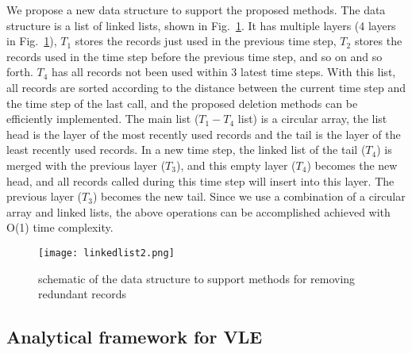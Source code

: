 We propose a new data structure to support the proposed methods. The data structure is a list of linked lists, shown in Fig.~\ref{ISAT_LL}. It has multiple layers (4 layers in Fig.~\ref{ISAT_LL}), $T_1$ stores the records just used in the previous time step, $T_2$ stores the records used in the time step before the previous time step, and so on and so forth. $T_4$ has all records not been used within 3 latest time steps. With this list, all records are sorted according to the distance between the current time step and the time step of the last call, and the proposed deletion methods can be efficiently implemented. The main list ($T_1-T_4$ list) is a circular array, the list head is the layer of the most recently used records and the tail is the layer of the least recently used records. In a new time step, the linked list of the tail ($T_4$) is merged with the previous layer ($T_3$), and this empty layer ($T_4$) becomes the new head, and all records called during this time step will insert into this layer. The previous layer ($T_3$) becomes the new tail. Since we use a combination of a circular array and linked lists, the above operations can be accomplished achieved with O(1) time complexity.

\begin{figure}[htbp]
\centering
\texttt{[image: linkedlist2.png]}
\caption{schematic of the data structure to support methods for removing redundant records}
\label{ISAT_LL} 
\end{figure}

\subsection{Analytical framework for VLE}
\label{sec:analytical}

